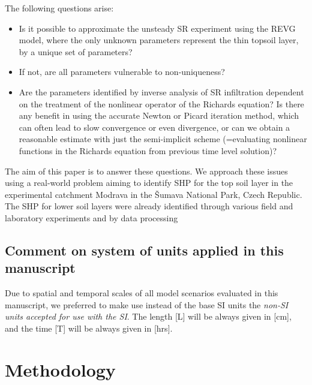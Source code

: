 \documentclass[review,times,3p,twocolumn,10pt]{elsarticle}
\begin{document}
The following questions arise: 
\begin{itemize}
	\item Is it possible to approximate the unsteady SR experiment using the REVG model, where the only unknown parameters represent the thin topsoil layer, by a unique set of parameters? \
	\item If not, are all parameters vulnerable to non-uniqueness?
	\item Are the parameters identified by inverse analysis of SR infiltration dependent on the treatment of the nonlinear operator of the Richards equation? Is there any benefit in using the accurate Newton or Picard iteration method, which can often lead to slow convergence or even divergence, or can we obtain a reasonable estimate with just the semi-implicit scheme (=evaluating nonlinear functions in the Richards equation from previous time level solution)?
\end{itemize}



The aim of this paper is to answer these questions. We approach these issues using a real-world problem aiming to identify SHP for the top soil layer in the experimental catchment Modrava in the \v{S}umava National Park, Czech Republic. The SHP for lower soil layers were already identified through various field and laboratory experiments and by data processing %


\subsection{Comment on system of units applied in this manuscript}

Due to spatial and temporal scales of all model scenarios evaluated in this manuscript, we preferred to make use  instead of the base SI units the {\it non-SI units  accepted for use with the SI}. The length [L] will be always given in [cm], and the time [T] will be always given in [hrs].






\section{Methodology}%
\label{metodo}
\end{document}
